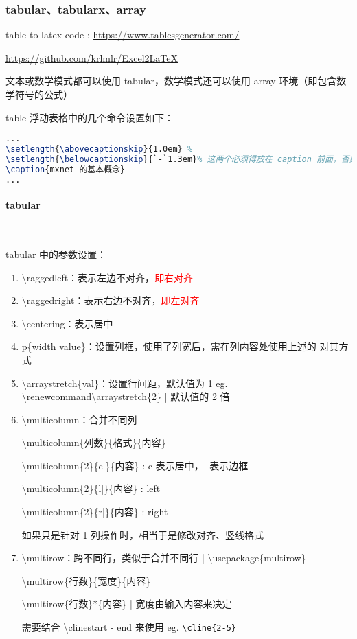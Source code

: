 
\subsubsection{tabular、tabularx、array}

table to latex code : \url{https://www.tablesgenerator.com/}

\url{https://github.com/krlmlr/Excel2LaTeX}

文本或数学模式都可以使用 tabular，数学模式还可以使用 array 环境（即包含数学符号的公式）

table 浮动表格中的几个命令设置如下：

\begin{lstlisting}[language={tex}]
...
\setlength{\abovecaptionskip}{1.0em} %
\setlength{\belowcaptionskip}{`-`1.3em}% 这两个必须得放在 caption 前面，否则不起作用
\caption{mxnet 的基本概念}
...
\end{lstlisting}

\paragraph{tabular}~{}

tabular 中的参数设置： 
\begin{enumerate}[topsep=0pt,itemsep=0pt,parsep=0pt,leftmargin=3.6em,label=\arabic*>]
    \item \textbackslash raggedleft：表示左边不对齐，\textcolor{red}{即右对齐}
    \item \textbackslash raggedright：表示右边不对齐，\textcolor{red}{即左对齐}
    \item \textbackslash centering：表示居中
    \item p\{width value\}：设置列框，使用了列宽后，需在列内容处使用上述的 对其方式
    \item \textbackslash arraystretch\{val\}：设置行间距，默认值为 1
        eg. \textbackslash renewcommand\textbackslash arraystretch\{2\} | 默认值的 2 倍
    \item \textbackslash multicolumn：合并不同列 \par
        \textbackslash multicolumn\{列数\}\{格式\}\{内容\} \par
        \textbackslash multicolumn\{2\}\{c|\}\{内容\} : {\color{red}c 表示居中，| 表示边框} \par
        \textbackslash multicolumn\{2\}\{l|\}\{内容\} : left \par
        \textbackslash multicolumn\{2\}\{r|\}\{内容\} : right \par
        \textcolor{DefinedColorGreen}{如果只是针对 1 列操作时，相当于是修改对齐、竖线格式}
    \item \textbackslash multirow：跨不同行，类似于合并不同行 | \textbackslash usepackage\{multirow\}\par
        \textbackslash multirow\{行数\}\{宽度\}\{内容\} \par
        \textbackslash multirow\{行数\}*\{内容\} | 宽度由输入内容来决定 \par
        需要结合 \textbackslash cline{start - end} 来使用 eg. \verb!\cline{2-5}!
\end{enumerate}

